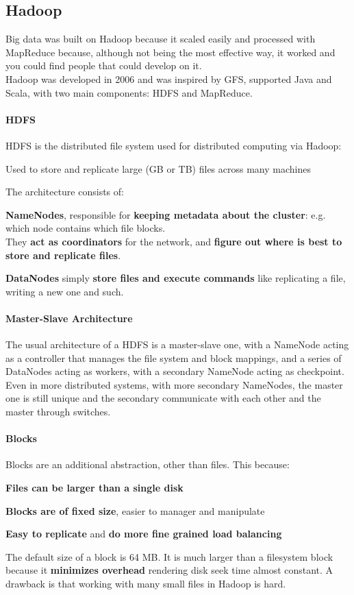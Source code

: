 \documentclass[10pt]{report}
\begin{document}
\subsection{Hadoop}
Big data was built on Hadoop because it scaled easily and processed with MapReduce because, although not being the most effective way, it worked and you could find people that could develop on it.\\
Hadoop was developed in 2006 and was inspired by GFS, supported Java and Scala, with two main components: HDFS and MapReduce.
\paragraph{HDFS} HDFS is the distributed file system used for distributed computing via Hadoop:
\begin{list}{}{}
	\item Used to store and replicate large (GB or TB) files across many machines
	\item The architecture consists of:
	\begin{list}{}{}
		\item \textbf{NameNodes}, responsible for \textbf{keeping metadata about the cluster}: e.g. which node contains which file blocks.\\
		They \textbf{act as coordinators} for the network, and \textbf{figure out where is best to store and replicate files}.
		\item \textbf{DataNodes} simply \textbf{store files and execute commands} like replicating a file, writing a new one and such.
	\end{list}
\end{list}
\paragraph{Master-Slave Architecture} The usual architecture of a HDFS is a master-slave one, with a NameNode acting as a controller that manages the file system and block mappings, and a series of DataNodes acting as workers,                           with a secondary NameNode acting as checkpoint. Even in more distributed systems, with more secondary NameNodes, the master one is still unique and the secondary communicate with each other and the master through switches.
\paragraph{Blocks} Blocks are an additional abstraction, other than files. This because:
\begin{list}{}{}
	\item \textbf{Files can be larger than a single disk}
	\item \textbf{Blocks are of fixed size}, easier to manager and manipulate
	\item \textbf{Easy to replicate} and \textbf{do more fine grained load balancing}
\end{list}
The default size of a block is 64 MB. It is much larger than a filesystem block because it \textbf{minimizes overhead} rendering disk seek time almost constant. A drawback is that working with many small files in Hadoop is hard.
\end{document}
